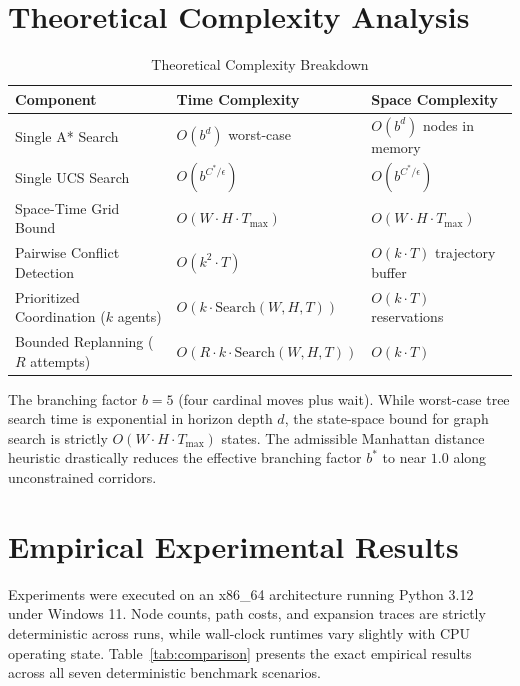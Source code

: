 \documentclass[11pt,a4paper]{article}
\begin{document}
\section{Theoretical Complexity Analysis}
\begin{table}[ht]
\centering
\caption{Theoretical Complexity Breakdown}
\label{tab:complexity}
\begin{tabular}{lll}
\toprule
\textbf{Component} & \textbf{Time Complexity} & \textbf{Space Complexity} \\
\midrule
Single A* Search & $O(b^d)$ worst-case & $O(b^d)$ nodes in memory \\
Single UCS Search & $O(b^{C^*/\epsilon})$ & $O(b^{C^*/\epsilon})$ \\
Space-Time Grid Bound & $O(W \cdot H \cdot T_{\max})$ & $O(W \cdot H \cdot T_{\max})$ \\
Pairwise Conflict Detection & $O(k^2 \cdot T)$ & $O(k \cdot T)$ trajectory buffer \\
Prioritized Coordination ($k$ agents) & $O(k \cdot \text{Search}(W, H, T))$ & $O(k \cdot T)$ reservations \\
Bounded Replanning ($R$ attempts) & $O(R \cdot k \cdot \text{Search}(W, H, T))$ & $O(k \cdot T)$ \\
\bottomrule
\end{tabular}
\end{table}
The branching factor $b = 5$ (four cardinal moves plus wait). While worst-case tree search time is exponential in horizon depth $d$, the state-space bound for graph search is strictly $O(W \cdot H \cdot T_{\max})$ states. The admissible Manhattan distance heuristic drastically reduces the effective branching factor $b^*$ to near $1.0$ along unconstrained corridors.

\section{Empirical Experimental Results}
Experiments were executed on an x86\_64 architecture running Python 3.12 under Windows 11. Node counts, path costs, and expansion traces are strictly deterministic across runs, while wall-clock runtimes vary slightly with CPU operating state. Table~\ref{tab:comparison} presents the exact empirical results across all seven deterministic benchmark scenarios.
\end{document}
